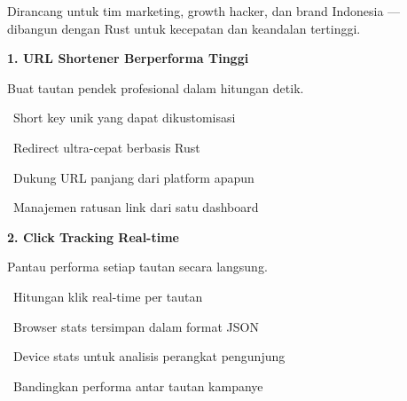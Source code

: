 \documentclass[a4paper]{article}
\begin{document}
{\fontsize{9.5}{13}\selectfont\color{TextLight}
Dirancang untuk tim marketing, growth hacker, dan brand Indonesia --- dibangun dengan Rust untuk kecepatan dan keandalan tertinggi.}

\vspace{6pt}

\noindent
\begin{minipage}[t]{0.485\textwidth}
    \colorbox{CyanPrimary}{%
        \begin{minipage}{\dimexpr\textwidth-14pt}
            \vspace{5pt}
            {\fontsize{10}{13}\selectfont\bfseries\color{White} 1. URL Shortener Berperforma Tinggi}
            \vspace{5pt}
        \end{minipage}}
    \vspace{5pt}
    {\fontsize{9}{12}\selectfont\color{TextDark}%
    Buat tautan pendek profesional dalam hitungan detik.\par\vspace{3pt}
    \textbullet\ Short key unik yang dapat dikustomisasi\par\vspace{2pt}%
    \textbullet\ Redirect ultra-cepat berbasis Rust\par\vspace{2pt}%
    \textbullet\ Dukung URL panjang dari platform apapun\par\vspace{2pt}%
    \textbullet\ Manajemen ratusan link dari satu dashboard}%
\end{minipage}%
\hfill
\begin{minipage}[t]{0.485\textwidth}
    \colorbox{BluePrimary}{%
        \begin{minipage}{\dimexpr\textwidth-14pt}
            \vspace{5pt}
            {\fontsize{10}{13}\selectfont\bfseries\color{White} 2. Click Tracking Real-time}
            \vspace{5pt}
        \end{minipage}}
    \vspace{5pt}
    {\fontsize{9}{12}\selectfont\color{TextDark}%
    Pantau performa setiap tautan secara langsung.\par\vspace{3pt}
    \textbullet\ Hitungan klik real-time per tautan\par\vspace{2pt}%
    \textbullet\ Browser stats tersimpan dalam format JSON\par\vspace{2pt}%
    \textbullet\ Device stats untuk analisis perangkat pengunjung\par\vspace{2pt}%
    \textbullet\ Bandingkan performa antar tautan kampanye}%
\end{minipage}
\end{document}
